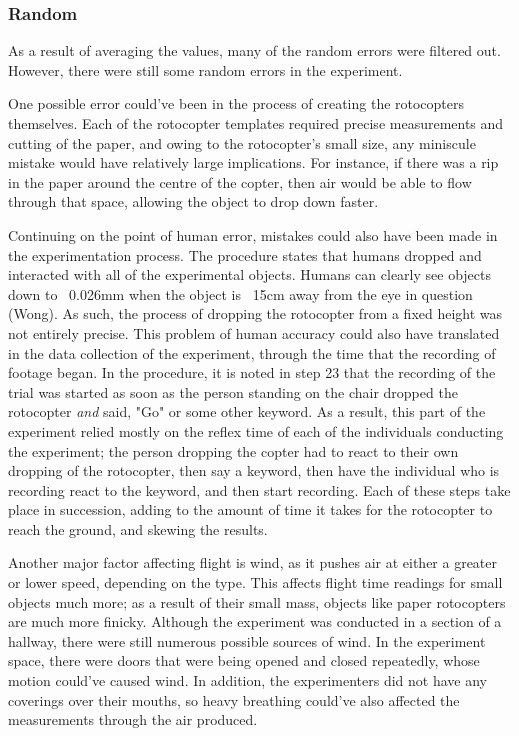 \documentclass[]{article}
\theoremstyle{definition}
\begin{document}
\subsubsection{Random}
As a result of averaging the values, many of the random errors were filtered out. However, there were still some random errors in the experiment.

One possible error could've been in the process of creating the rotocopters themselves. Each of the rotocopter templates required precise measurements and cutting of the paper, and owing to the rotocopter's small size, any miniscule mistake would have relatively large implications. For instance, if there was a rip in the paper around the centre of the copter, then air would be able to flow through that space, allowing the object to drop down faster.

Continuing on the point of human error, mistakes could also have been made in the experimentation process. The procedure states that humans dropped and interacted with all of the experimental objects. Humans can clearly see objects down to ~0.026mm when the object is ~15cm away from the eye in question (Wong). As such, the process of dropping the rotocopter from a fixed height was not entirely precise. This problem of human accuracy could also have translated in the data collection of the experiment, through the time that the recording of footage began. In the procedure, it is noted in step 23 that the recording of the trial was started as soon as the person standing on the chair dropped the rotocopter \textit{and} said, "Go" or some other keyword. As a result, this part of the experiment relied mostly on the reflex time of each of the individuals conducting the experiment; the person dropping the copter had to react to their own dropping of the rotocopter, then say a keyword, then have the individual who is recording react to the keyword, and then start recording. Each of these steps take place in succession, adding to the amount of time it takes for the rotocopter to reach the ground, and skewing the results.

Another major factor affecting flight is wind, as it pushes air at either a greater or lower speed, depending on the type. This affects flight time readings for small objects much more; as a result of their small mass, objects like paper rotocopters are much more finicky. Although the experiment was conducted in a section of a hallway, there were still numerous possible sources of wind. In the experiment space, there were doors that were being opened and closed repeatedly, whose motion could've caused wind. In addition, the experimenters did not have any coverings over their mouths, so heavy breathing could've also affected the measurements through the air produced.
\end{document}
